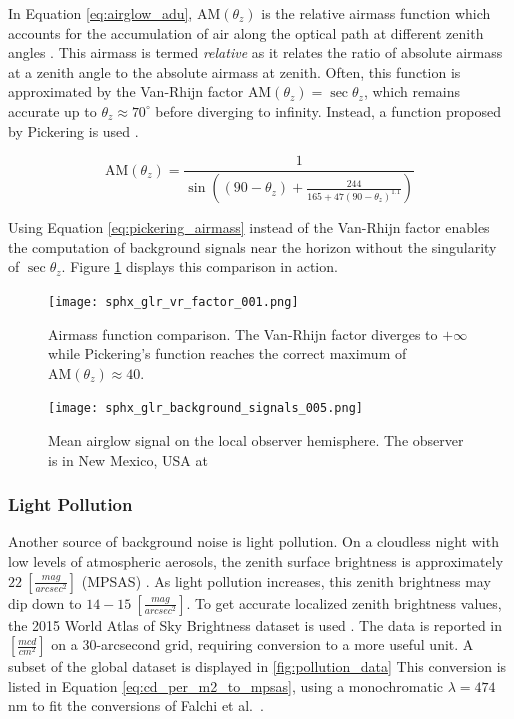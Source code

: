 In Equation \ref{eq:airglow_adu}, $\textrm{AM}(\theta_z)$ is the relative airmass function which accounts for the accumulation of air along the optical path at different zenith angles \cite{frueh2019notes}. This airmass is termed \textit{relative} as it relates the ratio of absolute airmass at a zenith angle to the absolute airmass at zenith. Often, this function is approximated by the Van-Rhijn factor $\textrm{AM}(\theta_z) = \sec{\theta_z}$, which remains accurate up to $\theta_z \approx 70^\circ$ before diverging to infinity. Instead, a function proposed by Pickering is used \cite{pickering2002}.

\begin{equation} \label{eq:pickering_airmass}
  \textrm{AM}(\theta_z) = \frac{1}{\sin\left((90 - \theta_z) +  \frac{244}{165 + 47 \left(90 - \theta_z \right)^{1.1}}\right)}
\end{equation}


Using Equation \ref{eq:pickering_airmass} instead of the Van-Rhijn factor enables the computation of background signals near the horizon without the singularity of $\sec \theta_z$. Figure \ref{fig:airmass_fcns} displays this comparison in action.

\begin{figure}[ht]
  \centering
  \texttt{[image: sphx\_glr\_vr\_factor\_001.png]}
  \caption{Airmass function comparison. The Van-Rhijn factor diverges to $+\infty$ while Pickering's function reaches the correct maximum of $\textrm{AM}(\theta_z) \approx 40$.}
  \label{fig:airmass_fcns}
\end{figure}

\begin{figure}[ht]
  \centering
  \texttt{[image: sphx\_glr\_background\_signals\_005.png]}
  \caption{Mean airglow signal on the local observer hemisphere. The observer is in New Mexico, USA at
  \pogslla}
  \label{fig:airglowhemi}
\end{figure}

\subsubsection{Light Pollution}

Another source of background noise is light pollution. On a cloudless night with low levels of atmospheric aerosols, 
the zenith surface brightness is approximately $22 \: \left[ \frac{mag}{arcsec^2}
\right]$ (MPSAS) \cite{krag2003}. As light pollution increases, this zenith brightness may dip down to
$14-15 \: \left[ \frac{mag}{arcsec^2} \right]$. To get accurate localized zenith brightness values,
 the 2015 World Atlas of Sky Brightness dataset is used \cite{falchi2016_data}. The data is reported in $\left[
	\frac{mcd}{cm^2} \right]$ on a 30-arcsecond grid, requiring conversion to a more useful unit. A subset of the global dataset is displayed in \ref{fig:pollution_data} This conversion is listed in Equation \ref{eq:cd_per_m2_to_mpsas}, using a monochromatic $\lambda = 474$ nm to fit the conversions of Falchi et al.\ \cite{falchi2016}.  

